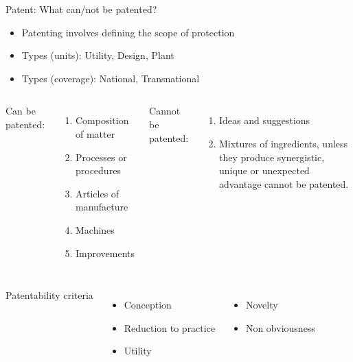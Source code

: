 \documentclass[
  ignorenonframetext,
  aspectratio=169]{beamer}
\providecommand{\tightlist}{%
  \setlength{\itemsep}{0pt}\setlength{\parskip}{0pt}}
\begin{document}
\begin{frame}{Patent: What can/not be patented?}
\protect\hypertarget{patent-what-cannot-be-patented}{}
\footnotesize

\begin{itemize}
\tightlist
\item
  Patenting involves defining the scope of protection
\item
  Types (units): Utility, Design, Plant
\item
  Types (coverage): National, Transnational
\end{itemize}

\begin{columns}[T,onlytextwidth]
  \footnotesize
  Can be patented:
  \begin{enumerate}
  \item Composition of matter
  \item Processes or procedures
  \item Articles of manufacture
  \item Machines
  \item Improvements
  \end{enumerate}
  
  Cannot be patented:
  \begin{enumerate}
  \item Ideas and suggestions
  \item Mixtures of ingredients, unless they produce synergistic, unique or unexpected advantage cannot be patented.
  \end{enumerate}
\end{columns}

\begin{columns}[T,onlytextwidth]
  \footnotesize
  \vspace{0.8cm}
  Patentability criteria
  \begin{itemize}
  \item Conception
  \item Reduction to practice
  \item Utility
  \end{itemize}
  
  \vspace{0.8cm}
  \begin{itemize}
  \item Novelty
  \item Non obviousness
  \end{itemize}
\end{columns}
\end{frame}
\end{document}
